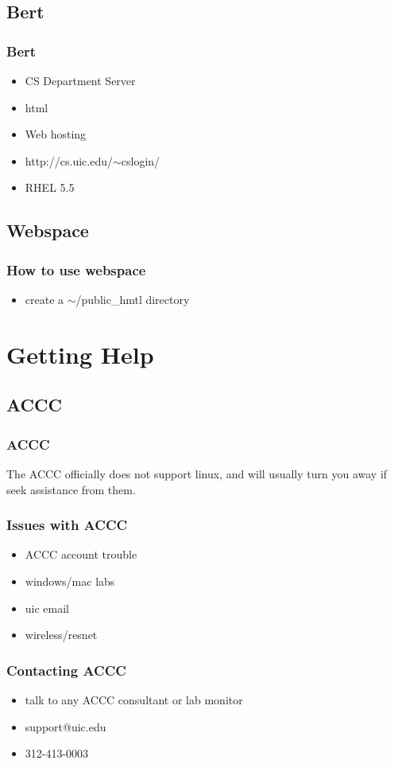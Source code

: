 \documentclass[hyperref={pdfpagelabels=false}]{beamer}
\begin{document}
\subsection{Bert}
\frame
{
    \frametitle{Bert}
    \begin{itemize}
    \item{CS Department Server}
    \item{html}
    \item{Web hosting}
    \item{http://cs.uic.edu/$\sim$cslogin/}
    \item{RHEL 5.5}
    \end{itemize}
}
\subsection{Webspace}
\frame
{
    \frametitle{How to use webspace}
    \begin{itemize}
    \item{create a $\sim$/public\_hmtl directory}
    \end{itemize}
}
\section{Getting Help}

\subsection{ACCC}
\frame
{
	\frametitle{ACCC}
	The ACCC officially does not support linux, and will usually turn you away if
	seek assistance from them.
}
\frame
{
    \frametitle{Issues with ACCC}
    \begin{itemize}
    \item{ACCC account trouble}
    \item{windows/mac labs}
    \item{uic email}
    \item{wireless/resnet}
    \end{itemize}
}
\frame
{
    \frametitle{Contacting ACCC}
    \begin{itemize}
    \item{talk to any ACCC consultant or lab monitor}
    \item{support@uic.edu}
    \item{312-413-0003}
    \end{itemize}
}
\end{document}
